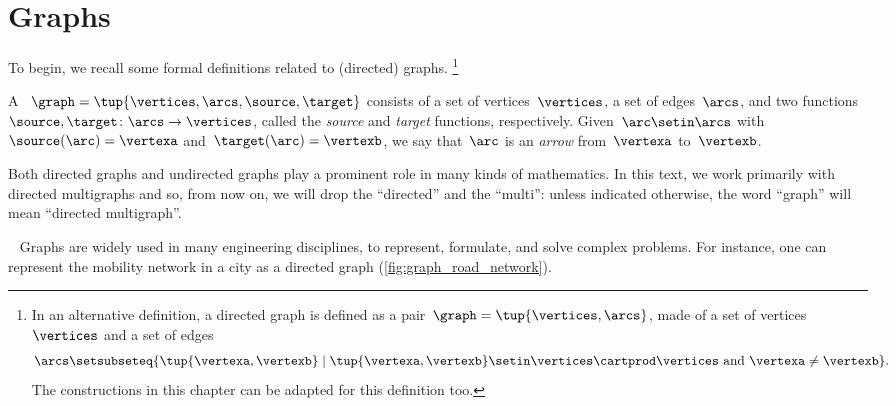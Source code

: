
\section{Graphs}


To begin, we recall some formal definitions related to (directed) graphs.
\footnote{
    In an alternative definition, a directed graph is defined as a pair~$\graph=\tup{\vertices, \arcs}$, made of a set of vertices~$\vertices$ and a set of edges
    \begin{equation*}
        \arcs \setsubseteq \{ \tup{\vertexa, \vertexb} \mid \tup{\vertexa, \vertexb} \setin \vertices \cartprod \vertices \text{ and } \vertexa \neq \vertexb\}.
    \end{equation*}
    The constructions in this chapter can be adapted for this definition too.
}

\begin{definition}
    \label{def:Graph}
    A \emph{}~$\graph=\tup{\vertices,\arcs, \source,\target}$ consists of a set of vertices~$\vertices$, a set of edges~$\arcs$, and two functions~$\source,\target \colon \arcs \to \vertices$, called the \emph{source} and \emph{target} functions, respectively.
    Given~$\arc\setin \arcs$ with~$\source(\arc)=\vertexa$ and~$\target(\arc)=\vertexb$, we say that~$\arc$ is an \emph{arrow} from~$\vertexa$ to~$\vertexb$.
\end{definition}


\begin{remark}
    Both directed graphs and undirected graphs play a prominent role in many kinds of mathematics.
    In this text, we work primarily with directed multigraphs and so, from now on, we will drop the ``directed'' and the ``multi'': unless indicated otherwise, the word ``graph'' will mean ``directed multigraph''.
\end{remark}
~
Graphs are widely used in many engineering disciplines, to represent, formulate, and solve complex problems.
For instance, one can represent the mobility network in a city as a directed graph (\cref{fig:graph_road_network}).

